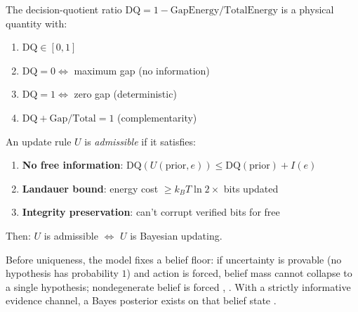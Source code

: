 \begin{theorem}\label{thm:dq-physical}
The decision-quotient ratio $\mathrm{DQ} = 1 - \text{GapEnergy}/\text{TotalEnergy}$ is a physical quantity with:
\begin{enumerate}
  \item $\mathrm{DQ} \in [0, 1]$ \quad {}
  \item $\mathrm{DQ} = 0 \Leftrightarrow$ maximum gap (no information) \quad {}
  \item $\mathrm{DQ} = 1 \Leftrightarrow$ zero gap (deterministic) \quad {}
  \item $\mathrm{DQ} + \text{Gap}/\text{Total} = 1$ (complementarity) \quad {}
\end{enumerate}
\end{theorem}

\begin{theorem}\label{thm:bayes-from-dq}
An update rule $U$ is \emph{admissible} if it satisfies:
\begin{enumerate}
  \item \textbf{No free information}: $\mathrm{DQ}(U(\text{prior}, e)) \le \mathrm{DQ}(\text{prior}) + I(e)$ \quad {}
  \item \textbf{Landauer bound}: energy cost $\ge k_BT \ln 2 \times$ bits updated \quad {}
  \item \textbf{Integrity preservation}: can't corrupt verified bits for free \quad {}
\end{enumerate}
Then: $U$ is admissible $\Leftrightarrow$ $U$ is Bayesian updating.
\end{theorem}

Before uniqueness, the model fixes a belief floor: if uncertainty is provable (no hypothesis has probability $1$) and action is forced, belief mass cannot collapse to a single hypothesis; nondegenerate belief is forced , . With a strictly informative evidence channel, a Bayes posterior exists on that belief state .

